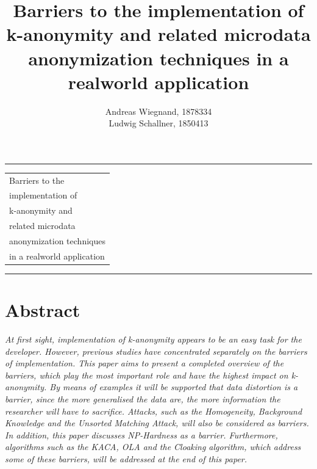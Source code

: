 \documentclass{llncs}
\begin{document}
\thispagestyle{empty}
\rule{\textwidth}{1pt}
\vspace{2pt}
\begin{flushright}
\Huge
\begin{tabular}{@{}l}
Barriers to the\\
implementation of\\
k-anonymity and\\
related microdata\\
anonymization techniques\\
in a realworld application\\[6pt]

\end{tabular}
\end{flushright}
\rule{\textwidth}{1pt}
\vfill
\title{Barriers to the implementation of k-anonymity and related microdata anonymization techniques in a realworld application}
\author{Andreas Wiegnand, 1878334\\
	Ludwig Schallner, 1850413}
\institute{}
\maketitle
%
\section*{Abstract}
\textit{At first sight, implementation of k-anonymity appears to be an easy task for the developer. However, previous studies have concentrated separately on the barriers of implementation. This paper aims to present a completed overview of the barriers, which play the most important role and have the highest impact on k-anonymity. By means of examples it will be supported that data distortion is a barrier, since the more generalised the data are, the more information the researcher will have to sacrifice. Attacks, such as the Homogeneity, Background Knowledge and the Unsorted Matching Attack, will also be considered as barriers. In addition, this paper discusses NP-Hardness as a barrier. Furthermore, algorithms such as the KACA, OLA and the Cloaking algorithm, which address some of these barriers, will be addressed at the end of this paper.}
\newpage
\setcounter{page}{1}
\end{document}
